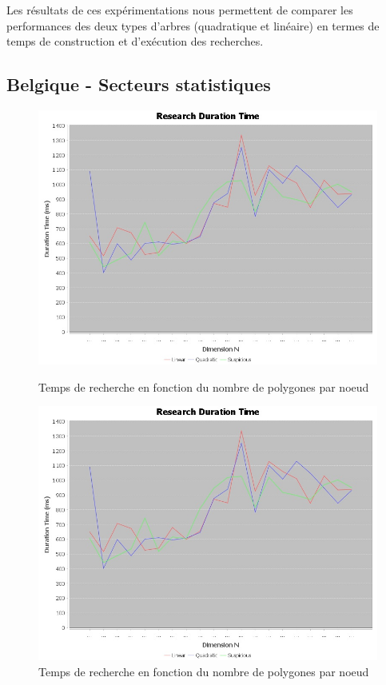 \documentclass {article}
\begin{document}
Les résultats de ces expérimentations nous permettent de comparer les performances des deux types d'arbres
(quadratique et linéaire) en termes de temps de construction et d'exécution des recherches.

\subsection {Belgique - Secteurs statistiques}\label{belgique}

\begin{figure}[h]
    \begin{minipage}[t]{0.46\textwidth}
	\centering
	\includegraphics[width=\textwidth]{research_graph_belgium.png}
	\caption{Temps de recherche en fonction du nombre de polygones par noeud}
	\label{fig:belgique_stat_find_lin}
    \end{minipage}
    \begin{minipage}[t]{0.46\textwidth}
	\centering
	\includegraphics[width=\textwidth]{research_graph_belgium.png}
	\caption{Temps de recherche en fonction du nombre de polygones par noeud}
	\label{fig:belgique_stat_find_quad}
    \end{minipage}
\end{figure}
\end{document}
